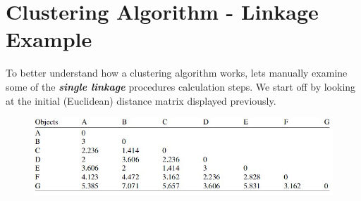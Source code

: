 \documentclass[a4paper,12pt]{article}
\begin{document}
\section{Clustering Algorithm - Linkage Example}
To better understand how a clustering algorithm works, lets manually examine
some of the \textbf{\textit{single linkage}} procedures calculation steps. We start off by looking at
the initial (Euclidean) distance matrix displayed previously.

\begin{figure}[h!]
	\begin{center}
		\includegraphics[scale=0.6]{images/DistanceMatrix.jpg}\\
	\end{center}
\end{figure}
\end{document}
